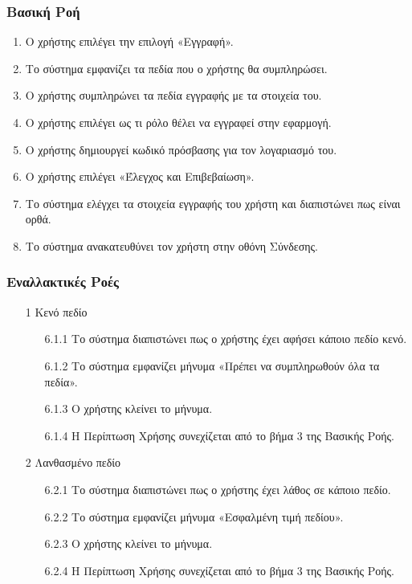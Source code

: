 \documentclass[12pt,a4paper,twoside]{book}
\begin{document}
\subsubsection{Βασική Ροή}
\begin{enumerate}
  \item Ο χρήστης επιλέγει την επιλογή «Εγγραφή».  %
  \item Το σύστημα εμφανίζει τα πεδία που ο χρήστης θα συμπληρώσει. %
  \item Ο χρήστης συμπληρώνει τα πεδία εγγραφής με τα στοιχεία του.   %
  \item Ο χρήστης επιλέγει ως τι ρόλο θέλει να εγγραφεί στην εφαρμογή.  %
  \item Ο χρήστης δημιουργεί κωδικό πρόσβασης για τον λογαριασμό του.  %
  \item Ο χρήστης επιλέγει «Έλεγχος και Επιβεβαίωση».%
  \item Το σύστημα ελέγχει τα στοιχεία εγγραφής του χρήστη και διαπιστώνει πως είναι ορθά. %
  \item Το σύστημα ανακατευθύνει τον χρήστη στην οθόνη Σύνδεσης. %
\end{enumerate}

\subsubsection{Εναλλακτικές Ροές}
\begin{enumerate}
  \item[1 ] Κενό πεδίο  %
        \begin{enumerate}
          \item[6.1.1 ] Το σύστημα διαπιστώνει πως ο χρήστης έχει αφήσει κάποιο πεδίο κενό. %
          \item[6.1.2 ] Το σύστημα εμφανίζει μήνυμα «Πρέπει να συμπληρωθούν όλα τα πεδία». %
          \item[6.1.3 ] Ο χρήστης κλείνει το μήνυμα. %
          \item[6.1.4 ] Η Περίπτωση Χρήσης συνεχίζεται από το βήμα 3 της Βασικής Ροής. %
        \end{enumerate}
  \item[2 ] Λανθασμένο πεδίο %
        \begin{enumerate}
          \item[6.2.1 ] Το σύστημα διαπιστώνει πως ο χρήστης έχει λάθος σε κάποιο πεδίο.%
          \item[6.2.2 ] Το σύστημα εμφανίζει μήνυμα «Εσφαλμένη τιμή πεδίου».  %
          \item[6.2.3 ] Ο χρήστης κλείνει το μήνυμα.%
          \item[6.2.4 ] Η Περίπτωση Χρήσης συνεχίζεται από το βήμα 3 της Βασικής Ροής. %
        \end{enumerate}
\end{enumerate}
\end{document}
